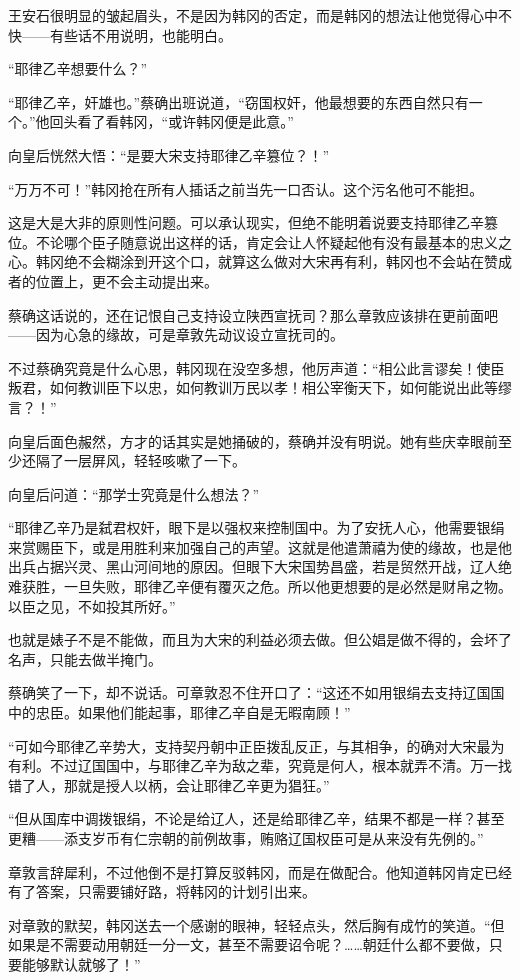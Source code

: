 王安石很明显的皱起眉头，不是因为韩冈的否定，而是韩冈的想法让他觉得心中不快——有些话不用说明，也能明白。 

“耶律乙辛想要什么？” 

“耶律乙辛，奸雄也。”蔡确出班说道，“窃国权奸，他最想要的东西自然只有一个。”他回头看了看韩冈，“或许韩冈便是此意。” 

向皇后恍然大悟：“是要大宋支持耶律乙辛篡位？！” 

“万万不可！”韩冈抢在所有人插话之前当先一口否认。这个污名他可不能担。 

这是大是大非的原则性问题。可以承认现实，但绝不能明着说要支持耶律乙辛篡位。不论哪个臣子随意说出这样的话，肯定会让人怀疑起他有没有最基本的忠义之心。韩冈绝不会糊涂到开这个口，就算这么做对大宋再有利，韩冈也不会站在赞成者的位置上，更不会主动提出来。 

蔡确这话说的，还在记恨自己支持设立陕西宣抚司？那么章敦应该排在更前面吧——因为心急的缘故，可是章敦先动议设立宣抚司的。 

不过蔡确究竟是什么心思，韩冈现在没空多想，他厉声道：“相公此言谬矣！使臣叛君，如何教训臣下以忠，如何教训万民以孝！相公宰衡天下，如何能说出此等缪言？！” 

向皇后面色赧然，方才的话其实是她捅破的，蔡确并没有明说。她有些庆幸眼前至少还隔了一层屏风，轻轻咳嗽了一下。 

向皇后问道：“那学士究竟是什么想法？” 

“耶律乙辛乃是弑君权奸，眼下是以强权来控制国中。为了安抚人心，他需要银绢来赏赐臣下，或是用胜利来加强自己的声望。这就是他遣萧禧为使的缘故，也是他出兵占据兴灵、黑山河间地的原因。但眼下大宋国势昌盛，若是贸然开战，辽人绝难获胜，一旦失败，耶律乙辛便有覆灭之危。所以他更想要的是必然是财帛之物。以臣之见，不如投其所好。” 

也就是婊子不是不能做，而且为大宋的利益必须去做。但公娼是做不得的，会坏了名声，只能去做半掩门。 

蔡确笑了一下，却不说话。可章敦忍不住开口了：“这还不如用银绢去支持辽国国中的忠臣。如果他们能起事，耶律乙辛自是无暇南顾！” 

“可如今耶律乙辛势大，支持契丹朝中正臣拨乱反正，与其相争，的确对大宋最为有利。不过辽国国中，与耶律乙辛为敌之辈，究竟是何人，根本就弄不清。万一找错了人，那就是授人以柄，会让耶律乙辛更为猖狂。” 

“但从国库中调拨银绢，不论是给辽人，还是给耶律乙辛，结果不都是一样？甚至更糟——添支岁币有仁宗朝的前例故事，贿赂辽国权臣可是从来没有先例的。” 

章敦言辞犀利，不过他倒不是打算反驳韩冈，而是在做配合。他知道韩冈肯定已经有了答案，只需要铺好路，将韩冈的计划引出来。 

对章敦的默契，韩冈送去一个感谢的眼神，轻轻点头，然后胸有成竹的笑道。“但如果是不需要动用朝廷一分一文，甚至不需要诏令呢？……朝廷什么都不要做，只要能够默认就够了！” 

